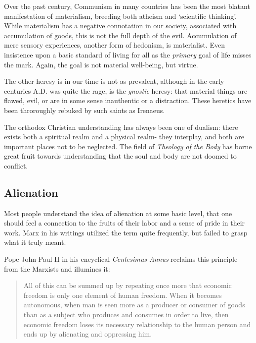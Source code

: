 \documentclass[letterpaper]{article}
\begin{document}
Over the past century, Communism in many countries has been the most blatant manifestation of materialism, breeding both atheism and `scientific thinking'. While materialism has a negative connotation in our society, associated with accumulation of goods, this is not the full depth of the evil. Accumulation of mere sensory experiences, another form of hedonism, is materialist. Even insistence upon a basic standard of living for all as the \textit{primary} goal of life misses the mark. Again, the goal is not material well-being, but virtue.

The other heresy is in our time is not as prevalent, although in the early centuries A.D. was quite the rage, is the \textit{gnostic} heresy: that material things are flawed, evil, or are in some sense inauthentic or a distraction. These heretics have been throroughly rebuked by such saints as Irenaeus.


The orthodox Christian understanding has always been one of dualism: there exists both a spiritual realm and a physical realm- they interplay, and both are important places not to be neglected. The field of \textit{Theology of the Body} has borne great fruit towards understanding that the soul and body are not doomed to conflict.

\subsection{Alienation}

Most people understand the idea of alienation at some basic level, that one should feel a connection to the fruits of their labor and a sense of pride in their work. Marx in his writings utilized the term quite frequently, but failed to grasp what it truly meant.

Pope John Paul II in his encyclical \textit{Centesimus Annus} reclaims this principle from the Marxists and illumines it:

\begin{quote}
  All of this can be summed up by repeating once more that economic freedom is only one element of human freedom. When it becomes autonomous, when man is seen more as a producer or consumer of goods than as a subject who produces and consumes in order to live, then economic freedom loses its necessary relationship to the human person and ends up by alienating and oppressing him.
\end{quote}
\end{document}
